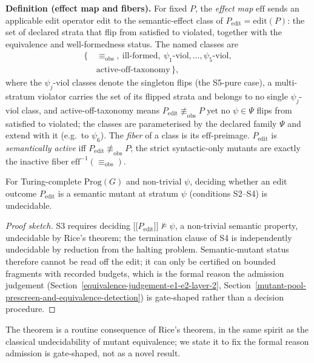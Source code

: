 \documentclass[manuscript,screen,review]{acmart}
\begin{document}
\textbf{Definition (effect map and fibers).} For fixed $P$, the
\emph{effect map} $\mathrm{eff}$ sends an applicable edit operator
$\mathrm{edit}$ to the
semantic-effect class of $P_{\mathrm{edit}} = \mathrm{edit}(P)$: the set
of declared strata that flip from satisfied to violated, together with
the equivalence and well-formedness status. The named classes are
\[
\begin{aligned}
\{\,&\equiv_{\mathrm{obs}},\ \text{ill-formed},\
      \psi_1\text{-viol}, \dots, \psi_5\text{-viol},\\
   &\text{active-off-taxonomy}\,\},
\end{aligned}
\]
where the $\psi_j$-viol classes denote the singleton flips (the
S5-pure case), a multi-stratum violator carries the set of its flipped
strata and belongs to no single $\psi_j$-viol class, and
active-off-taxonomy means $P_{\mathrm{edit}} \not\equiv_{\mathrm{obs}} P$ yet no
$\psi \in \Psi$ flips from satisfied to violated; the classes are
parameterised by the declared family $\Psi$ and extend with it
(e.g.\ to $\psi_6$). The \emph{fiber} of a
class is its $\mathrm{eff}$-preimage. $P_{\mathrm{edit}}$ is \emph{semantically active} iff
$P_{\mathrm{edit}} \not\equiv_{\mathrm{obs}} P$; the strict syntactic-only mutants are exactly
the inactive fiber $\mathrm{eff}^{-1}(\equiv_{\mathrm{obs}})$.

\begin{theorem}\label{thm:undecidability}
For
Turing-complete $\mathrm{Prog}(G)$ and non-trivial $\psi$, deciding
whether an edit outcome $P_{\mathrm{edit}}$ is a semantic mutant at stratum $\psi$
(conditions S2--S4) is undecidable.
\end{theorem}

\begin{proof}[Proof sketch]
S3 requires
deciding $\mathopen{\lbrack\!\lbrack} P_{\mathrm{edit}} \mathclose{\rbrack\!\rbrack} \not\models \psi$, a non-trivial
semantic property, undecidable by Rice's theorem; the termination clause
of S4 is independently undecidable by reduction from the halting
problem. Semantic-mutant status therefore cannot be read off the edit;
it can only be certified on bounded fragments with recorded budgets,
which is the formal reason the admission judgement (Section~\ref{equivalence-judgement-e1-e2-layer-2}, Section~\ref{mutant-pool-prescreen-and-equivalence-detection}) is
gate-shaped rather than a decision procedure.
\end{proof}

The theorem is a routine consequence of Rice's theorem, in the same
spirit as the classical undecidability of mutant equivalence; we state
it to fix the formal reason admission is gate-shaped, not as a novel
result.
\end{document}
